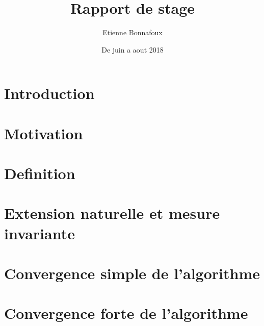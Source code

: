 \documentclass[12pt]{article}
\theoremstyle{plain}%
\theoremstyle{definition}
\theoremstyle{remark}
\begin{document}
\title{Rapport de stage}
\author{Etienne Bonnafoux}
\date{De juin a aout 2018}

\maketitle
\newpage

\tableofcontents
\newpage

\section{Introduction}

\newpage

\section{Motivation}

\newpage

\section{Definition}

\newpage

\section{Extension naturelle et mesure invariante}

\newpage

\section{Convergence simple de l'algorithme}

\newpage

\section{Convergence forte de l'algorithme}

\newpage



\end{document}
